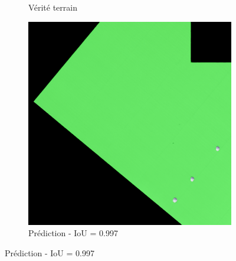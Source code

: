 \begin{figure}[H]
\begin{subfigure}{0.32\textwidth}
    \caption{Vérité terrain}
\end{subfigure}
\hfill
\begin{subfigure}{0.32\textwidth}
    \includegraphics[width=\textwidth]{02-main//figures/ch4/kfold_ensembles/segformer_tu-mambaout_base/best_cases/best_5_iou0.997_24991116_tile_5_3_322356_overlay_pred.png}
    \caption{Prédiction - IoU = 0.997}
\end{subfigure}

\vspace{0.35cm}


\end{figure}
